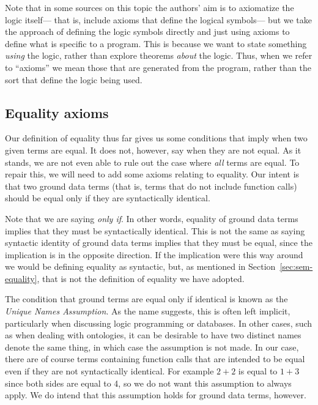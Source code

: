 Note that in some sources on this topic
the authors' aim is to axiomatize the logic itself---%
that is, include axioms that define the logical symbols---%
but we take the approach of defining the logic symbols directly
and just using axioms to define what is specific to a program.
This is because we want to state something \emph{using} the logic,
rather than explore theorems \emph{about} the logic.
Thus, when we refer to ``axioms''
we mean those that are generated from the program,
rather than the sort that define the logic being used.


\subsection{Equality axioms}
\label{sec:ax-equality}

Our definition of equality thus far
gives us some conditions that imply when two given terms are equal.
It does not, however, say when they are not equal.
As it stands,
we are not even able to rule out the case where
\emph{all} terms are equal.
To repair this,
we will need to add some axioms relating to equality.
Our intent is that two ground data terms\label{gi:data-term}
(that is, terms that do not include function calls)
should be equal only if they are syntactically identical.

Note that we are saying \emph{only if}.
In other words,
equality of ground data terms implies that
they must be syntactically identical.
This is not the same as saying
syntactic identity of ground data terms
implies that they must be equal,
since the implication is in the opposite direction.
If the implication were this way around
we would be defining equality as syntactic,
but, as mentioned in Section~\ref{sec:sem-equality},
that is not the definition of equality we have adopted.

The condition that ground terms are equal only if identical
is known as the \emph{Unique Names Assumption\label{gi:una}}.
As the name suggests, this is often left implicit,
particularly when discussing logic programming or databases.
In other cases, such as when dealing with ontologies,
it can be desirable to have two distinct names denote the same thing,
in which case the assumption is not made.
In our case,
there are of course terms containing function calls
that are intended to be equal even if they are not syntactically identical.
For example $2 + 2$ is equal to $1 + 3$
since both sides are equal to 4,
so we do not want this assumption to always apply.
We do intend that this assumption holds for ground data terms, however.

